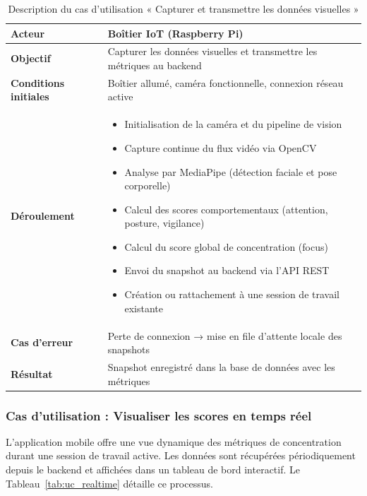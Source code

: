 \begin{table}[H]
\centering
\renewcommand{\arraystretch}{1.2}
\begin{tabular}{|p{4cm}|p{10cm}|}
\hline
\textbf{Acteur} & Boîtier IoT (Raspberry Pi) \\ \hline

\textbf{Objectif} & Capturer les données visuelles et transmettre les métriques au backend \\ \hline

\textbf{Conditions initiales} & Boîtier allumé, caméra fonctionnelle, connexion réseau active \\ \hline

\textbf{Déroulement} &
\begin{itemize}
    \item Initialisation de la caméra et du pipeline de vision
    \item Capture continue du flux vidéo via OpenCV
    \item Analyse par MediaPipe (détection faciale et pose corporelle)
    \item Calcul des scores comportementaux (attention, posture, vigilance)
    \item Calcul du score global de concentration (focus)
    \item Envoi du snapshot au backend via l'API REST
    \item Création ou rattachement à une session de travail existante
\end{itemize} \\ \hline

\textbf{Cas d'erreur} & Perte de connexion → mise en file d'attente locale des snapshots \\ \hline

\textbf{Résultat} & Snapshot enregistré dans la base de données avec les métriques \\ \hline
\end{tabular}
\caption{Description du cas d'utilisation « Capturer et transmettre les données visuelles »}
\label{tab:uc_capture}
\end{table}

\subsubsection{Cas d'utilisation : Visualiser les scores en temps réel}

L'application mobile offre une vue dynamique des métriques de concentration durant une session de travail active. Les données sont récupérées périodiquement depuis le backend et affichées dans un tableau de bord interactif. Le Tableau~\ref{tab:uc_realtime} détaille ce processus.

